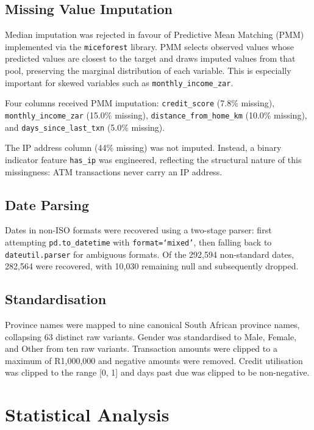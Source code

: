 \documentclass[12pt, a4paper]{article}
\begin{document}
\subsection{Missing Value Imputation}

Median imputation was rejected in favour of Predictive Mean Matching (PMM) implemented via the \texttt{miceforest} library. PMM selects observed values whose predicted values are closest to the target and draws imputed values from that pool, preserving the marginal distribution of each variable. This is especially important for skewed variables such as \texttt{monthly\_income\_zar}.

Four columns received PMM imputation: \texttt{credit\_score} (7.8\% missing), \texttt{monthly\_income\_zar} (15.0\% missing), \texttt{distance\_from\_home\_km} (10.0\% missing), and \texttt{days\_since\_last\_txn} (5.0\% missing).

The IP address column (44\% missing) was not imputed. Instead, a binary indicator feature \texttt{has\_ip} was engineered, reflecting the structural nature of this missingness: ATM transactions never carry an IP address.

\subsection{Date Parsing}

Dates in non-ISO formats were recovered using a two-stage parser: first attempting \texttt{pd.to\_datetime} with \texttt{format=`mixed'}, then falling back to \texttt{dateutil.parser} for ambiguous formats. Of the 292,594 non-standard dates, 282,564 were recovered, with 10,030 remaining null and subsequently dropped.

\subsection{Standardisation}

Province names were mapped to nine canonical South African province names, collapsing 63 distinct raw variants. Gender was standardised to Male, Female, and Other from ten raw variants. Transaction amounts were clipped to a maximum of R1,000,000 and negative amounts were removed. Credit utilisation was clipped to the range [0, 1] and days past due was clipped to be non-negative.

\section{Statistical Analysis}
\end{document}
